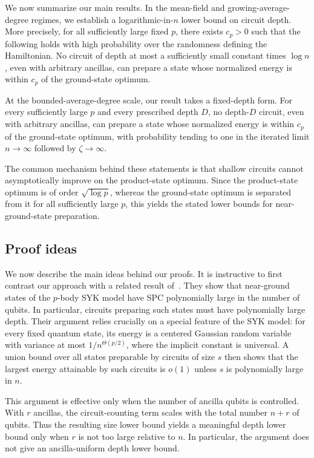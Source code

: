 \documentclass[12pt]{article}
\begin{document}
We now summarize our main results. In the mean-field and growing-average-degree regimes, we establish a logarithmic-in-\(n\) lower bound on circuit depth. More precisely, for all sufficiently large fixed \(p\), there
exists \(c_p>0\) such that the following holds with high probability over the
randomness defining the Hamiltonian. No circuit of depth at most a sufficiently
small constant times \(\log n\), even with arbitrary ancillas, can prepare a
state whose normalized energy is within \(c_p\) of the ground-state optimum.

At the bounded-average-degree scale, our result takes a fixed-depth form.
For every sufficiently large \(p\) and every prescribed depth \(D\), no
depth-\(D\) circuit, even with arbitrary ancillas, can prepare a state whose
normalized energy is within \(c_p\) of the ground-state optimum, with
probability tending to one in the iterated limit \(n\to\infty\) followed by
\(\zeta\to\infty\).

The common mechanism behind these statements is that shallow circuits cannot
asymptotically improve on the product-state optimum. Since the product-state
optimum is of order \(\sqrt{\log p}\), whereas the ground-state optimum is
separated from it for all sufficiently large \(p\), this yields the stated
lower bounds for near-ground-state preparation.



\subsection{Proof ideas}


We now describe the main ideas behind our proofs. It is instructive to first contrast our approach with a related result of~\cite{anschuetz2025strongly}. They show that near-ground states of the $p$-body SYK model have SPC polynomially large in the number of qubits. In particular, circuits preparing such states must have polynomially large depth. Their argument relies crucially on a special feature of the SYK model: for every fixed quantum state, its energy is a centered Gaussian random variable with variance at most $1/n^{\Theta(p/2)}$, where the implicit constant is universal. A union bound over all states preparable by circuits of size $s$ then shows that the largest energy attainable by such circuits is $o(1)$ unless $s$ is polynomially large in $n.$ 

This argument is effective only when the number of ancilla qubits is controlled. With $r$ ancillas, the circuit-counting term scales with the total number $n+r$ of qubits. Thus the resulting size lower bound yields a meaningful depth lower bound only when $r$ is not too large relative to $n$. In particular, the argument does not give an ancilla-uniform depth lower bound.
\end{document}
